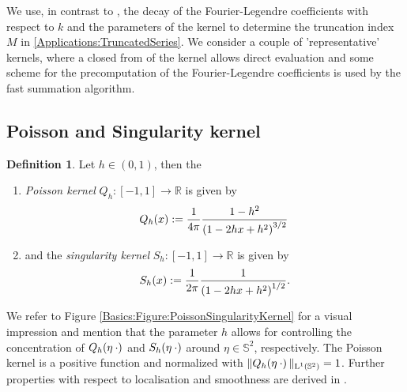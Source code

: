 \documentclass[11pt,a4paper,twoside,bibtotoc]{scrartcl}
\theoremstyle{plain}
\theoremstyle{definition}
\newtheorem{definition}[theorem]{Definition}
\theoremstyle{remark}
\newcommand{\R}{\ensuremath{\mathbb{R}}}
\newcommand{\twosphere}{\ensuremath{\mathbb{S}^2}}
\newcommand{\Ln}[2]{\ensuremath{\text{\rm{L}}^{#1}\left(#2\right)}}
\newcommand{\interv}[4]{\ensuremath{\left#1\left.#2,#3\right#4\right.}}
\newcommand{\fun}[2]{\ensuremath{#1{\hspace{-0.4ex}}\left(#2\right)}}
\newcommand{\paren}[1]{\ensuremath{\left(#1\right)}}
\newcommand{\mb}[1]{\mathbf{#1}}
\newcommand{\V}[1]{\mb{#1}}
\numberwithin{equation}{section}
\numberwithin{table}{section}
\numberwithin{figure}{section}
\begin{document}
We use, in contrast to \cite{Sc97,bahu01,CaFi}, the decay of the
Fourier-Legendre coefficients with respect to $k$ and the parameters of the
kernel to determine the truncation index $M$ 
in \eqref{Applications:TruncatedSeries}.
We consider a couple of 'representative' kernels, where a closed from of the
kernel allows direct evaluation and some scheme for the precomputation of the
Fourier-Legendre coefficients is used by the fast summation algorithm.

\subsection{Poisson and Singularity kernel}
\begin{definition}\label{def:poisson_sing}
  Let $h \in \interv{(}{0}{1}{)}$, then the
  \begin{enumerate}
  \item \emph{Poisson kernel}
    $Q_{h}:\interv{[}{-1}{1}{]} \rightarrow \R$ is given by
    \[
    \fun{Q_{h}}{x} := \frac{1}{4\pi} \frac{1-h^2}{\paren{1-2hx+h^2}^{3/2}}\,
    \]
  \item and the \emph{singularity kernel}
    $S_{h}:\interv{[}{-1}{1}{]} \rightarrow \R$ is given by
    \[
    \fun{S_{h}}{x} := \frac{1}{2\pi} \frac{1}{\paren{1-2hx+h^2}^{1/2}}.
    \]
  \end{enumerate}
\end{definition}

We refer to Figure \ref{Basics:Figure:PoissonSingularityKernel} for a visual
impression and mention that the parameter $h$ allows for controlling the
concentration of $\fun{Q_{h}}{\V{\eta} \: \cdot}$ and $\fun{S_{h}}{\V{\eta} \:
  \cdot}$ around $\eta \in \twosphere$, respectively.
The Poisson kernel is a positive function and normalized with
$\|\fun{Q_{h}}{\V{\eta} \: \cdot}\|_{\Ln{1}{\twosphere}}=1$.
Further properties with respect to localisation and smoothness are derived
in \cite[pp. 112]{frgesc}.
\end{document}
